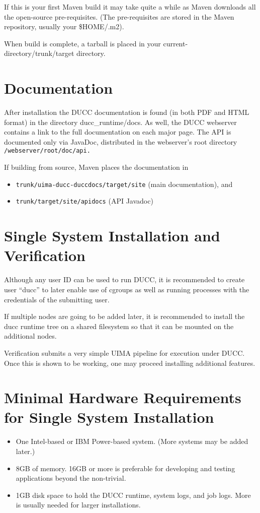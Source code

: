 If this is your first Maven build it may take quite a while as Maven downloads all the
open-source pre-requisites.  (The pre-requisites are stored in the Maven repository, usually
your \$HOME/.m2).

When build is complete, a tarball is placed in your current-directory/trunk/target
directory.

\section{Documentation}
\begin{sloppypar}
After installation the DUCC documentation is found (in both PDF and HTML format) in the directory 
ducc\_runtime/docs.  As well, the DUCC webserver contains a link to the full documentation on each major page.
The API is documented only via JavaDoc, distributed in the webserver's root directory 
{\tt \duccruntime/webserver/root/doc/api.}  
\end{sloppypar}

If building from source, Maven places the documentation in
\begin{itemize}
    \item {\tt trunk/uima-ducc-duccdocs/target/site} (main documentation), and 
    \item {\tt trunk/target/site/apidocs} (API Javadoc)
\end{itemize}

\section{Single System Installation and Verification}

Although any user ID can be used to run DUCC, it is recommended to create user ``ducc''
to later enable use of cgroups as well as running processes with the credentials of the submitting user.

If multiple nodes are going to be added later, it is recommended to install the ducc runtime tree
on a shared filesystem so that it can be mounted on the additional nodes.

Verification submits a very simple UIMA pipeline for execution under DUCC.  Once this is shown to be
working, one may proceed installing additional features.


\section{Minimal Hardware Requirements for Single System Installation}
\begin{itemize}
    \item One Intel-based or IBM Power-based system.  (More systems may be added later.)

    \item 8GB of memory.  16GB or more is preferable for developing and testing applications beyond
      the non-trivial.  

    \item 1GB disk space to hold the DUCC runtime, system logs, and job logs.  More is
      usually needed for larger installations.  
\end{itemize}

